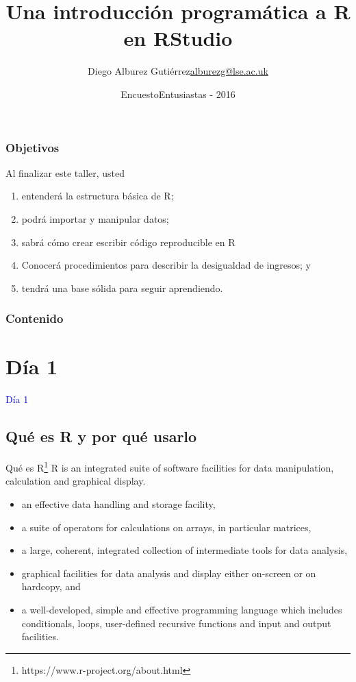 \documentclass{beamer}
\title{Una introducci\'on program\'atica a R en RStudio}
\author{\texorpdfstring{Diego Alburez Guti\'errez\newline\url{alburezg@lse.ac.uk}}{Diego Alburez Guti\'errez}}
\date{EncuestoEntusiastas - 2016}
\institute{London School of Economics}
\begin{document}
\begin{frame}
\maketitle
\end{frame}

\begin{frame}
\frametitle{Objetivos}
Al finalizar este taller, usted 
 \begin{enumerate}
  \item entender\'a la estructura b\'asica de R;
  \item podr\'a importar y manipular datos;
  \item sabr\'a c\'omo crear escribir c\'odigo reproducible en R
  \item Conocer\'a procedimientos para describir la desigualdad de ingresos; y
  \item tendr\'a una base s\'olida para seguir aprendiendo.
 \end{enumerate}
\end{frame}

\begin{frame}
\frametitle{Contenido}
\tableofcontents
\end{frame}

\section{D\'ia 1}

\begin{frame}
 \begin{center}
  \Huge \textcolor{blue}{D\'ia 1}
 \end{center}
\end{frame}

\subsection{Qu\'e es R y por qu\'e usarlo}
\frame{\tableofcontents[currentsection]}

  \begin{frame}{Qu\'e es R\footnote{https://www.r-project.org/about.html}}
R is an integrated suite of software facilities for data manipulation, calculation and graphical display.
     \begin{itemize}
		\item an effective data handling and storage facility,
		\item a suite of operators for calculations on arrays, in particular matrices,
		\item a large, coherent, integrated collection of intermediate tools for data analysis,
		\item graphical facilities for data analysis and display either on-screen or on hardcopy, and
		\item a well-developed, simple and effective programming language which includes conditionals, loops, user-defined recursive functions and input and output facilities.
      \end{itemize}
  \end{frame}
  
\end{document}
